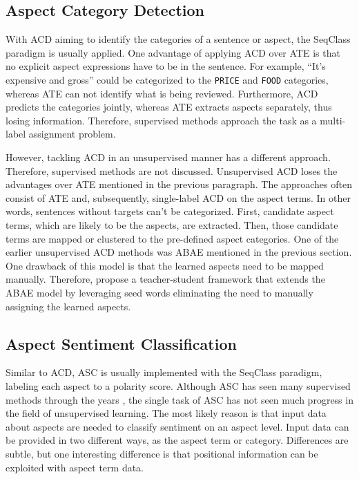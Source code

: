\documentclass[american, oneside]{ecsgdp}
\begin{document}
\subsection{Aspect Category Detection} \label{sec:ACD}
With ACD aiming to identify the categories of a sentence or aspect, the SeqClass paradigm is usually applied. One advantage of applying ACD over ATE is that no explicit aspect expressions have to be in the sentence. For example, ``It's expensive and gross'' could be categorized to the \texttt{PRICE} and \texttt{FOOD} categories, whereas ATE can not identify what is being reviewed. Furthermore, ACD predicts the categories jointly, whereas ATE extracts aspects separately, thus losing information. Therefore, supervised methods approach the task as a multi-label assignment problem. 

However, tackling ACD in an unsupervised manner has a different approach. Therefore, supervised methods are not discussed. Unsupervised ACD loses the advantages over ATE mentioned in the previous paragraph. The approaches often consist of ATE and, subsequently, single-label ACD on the aspect terms. In other words, sentences without targets can't be categorized. First, candidate aspect terms, which are likely to be the aspects, are extracted. Then, those candidate terms are mapped or clustered to the pre-defined aspect categories. One of the earlier unsupervised ACD methods was ABAE mentioned in the previous section. One drawback of this model is that the learned aspects need to be mapped manually. Therefore, \textcite{Karamanolakis2019Seed} propose a teacher-student framework that extends the ABAE model by leveraging seed words eliminating the need to manually assigning the learned aspects. %

\subsection{Aspect Sentiment Classification} \label{sec:ASC}
Similar to ACD, ASC is usually implemented with the SeqClass paradigm, labeling each aspect to a polarity score. Although ASC has seen many supervised methods through the years \parencite{Zhang2022Survey}, the single task of ASC has not seen much progress in the field of unsupervised learning. The most likely reason is that input data about aspects are needed to classify sentiment on an aspect level. Input data can be provided in two different ways, as the aspect term or category. Differences are subtle, but one interesting difference is that positional information can be exploited with aspect term data.
\end{document}
